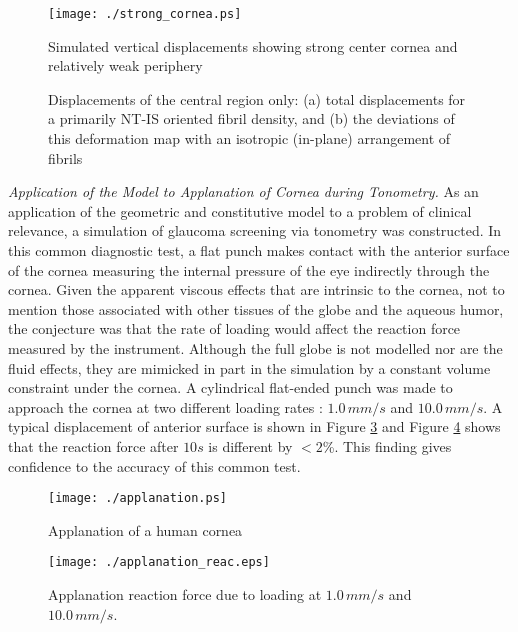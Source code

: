 \documentclass[11pt,oneside]{elsart}
\newcommand{\figref}[1]{Figure \ref{#1}}
\begin{document}
%
\begin{figure}[hptb]
\begin{center}
{\texttt{[image: ./strong\_cornea.ps]}} 
  \caption{Simulated vertical displacements showing strong center cornea and
relatively weak periphery}
  \label{fig:strong_cornea}
\end{center}
\end{figure}
%
\begin{figure}[hptb]
\begin{center}

\caption{ Displacements of the central region only: (a) total displacements
for a primarily NT-IS oriented fibril density, and (b) the deviations
of this deformation map with an isotropic (in-plane) arrangement of fibrils}
  \label{fig:diff_with_iso}
\end{center}
\end{figure}

{\it Application of the Model to Applanation of Cornea during Tonometry.}
As an application of the geometric and constitutive model to a problem
of clinical relevance, a simulation of glaucoma screening via tonometry was
constructed. 
In this common diagnostic test, a flat punch makes contact with the anterior surface
of the cornea measuring the internal pressure of the eye indirectly through
the cornea. 
Given the apparent viscous effects that are intrinsic to the cornea, not
to mention those associated with other tissues of the globe and
the aqueous humor, the conjecture was that the rate of loading would affect
the reaction force measured by the instrument. 
Although the full globe is not modelled nor are the fluid effects, they
are mimicked in part in the simulation by a constant volume constraint under the cornea. 
A cylindrical flat-ended punch was made to approach the cornea at
two different loading rates : $1.0 \, mm/s$ and $10.0 \, mm/s$.
A typical displacement of anterior surface is shown in \figref{fig:applanation}
and \figref{fig:applanation_reac} shows that the reaction force after $10s$ is different by
$< 2$\%.
This finding gives confidence to the accuracy of this common test.
%
\begin{figure}[hptb]
\begin{center}
{\texttt{[image: ./applanation.ps]}} 
  \caption{Applanation of a human cornea}
  \label{fig:applanation}
\end{center}
\end{figure}
%
\begin{figure}[hptb]
\begin{center}
{\texttt{[image: ./applanation\_reac.eps]}} 
  \caption{Applanation reaction force due to loading at $1.0 \, mm/s$ and $10.0 \, mm/s$.}
  \label{fig:applanation_reac}
\end{center}
\end{figure}
\end{document}
